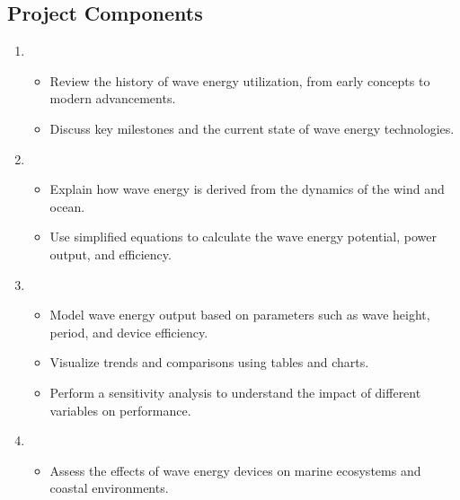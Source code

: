 \documentclass[letterpaper,10pt,english]{jupyterBook}
\begin{document}
\subsection{Project Components}
\label{\detokenize{ProjectInstructions:id47}}\begin{enumerate}
%
\item {} 
\sphinxAtStartPar
{}
\begin{itemize}
\item {} 
\sphinxAtStartPar
Review the history of wave energy utilization, from early concepts to modern advancements.

\item {} 
\sphinxAtStartPar
Discuss key milestones and the current state of wave energy technologies.

\end{itemize}

\item {} 
\sphinxAtStartPar
{}
\begin{itemize}
\item {} 
\sphinxAtStartPar
Explain how wave energy is derived from the dynamics of the wind and ocean.

\item {} 
\sphinxAtStartPar
Use simplified equations to calculate the wave energy potential, power output, and efficiency.

\end{itemize}

\item {} 
\sphinxAtStartPar
{}
\begin{itemize}
\item {} 
\sphinxAtStartPar
Model wave energy output based on parameters such as wave height, period, and device efficiency.

\item {} 
\sphinxAtStartPar
Visualize trends and comparisons using tables and charts.

\item {} 
\sphinxAtStartPar
Perform a sensitivity analysis to understand the impact of different variables on performance.

\end{itemize}

\item {} 
\sphinxAtStartPar
{}
\begin{itemize}
\item {} 
\sphinxAtStartPar
Assess the effects of wave energy devices on marine ecosystems and coastal environments.


\end{itemize}
\end{enumerate}
\end{document}
